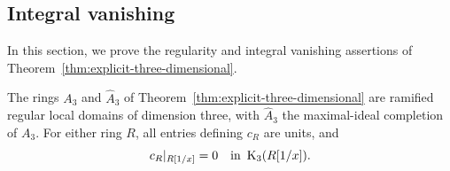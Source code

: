 \subsection{Integral vanishing}\label{c3:sec:integral}

In this section, we prove the regularity and integral vanishing
assertions of Theorem~\ref{thm:explicit-three-dimensional}.

\begin{proposition}\label{c3:prop:integral}
The rings $A_3$ and $\widehat A_3$ of
Theorem~\ref{thm:explicit-three-dimensional} are ramified regular local
domains of dimension three, with $\widehat A_3$ the maximal-ideal
completion of $A_3$. For either ring $R$, all entries defining $c_R$
are units, and
\[
 c_R|_{R[1/x]}=0\quad\text{in }\operatorname{K}_3(R[1/x]).
\]
\end{proposition}

